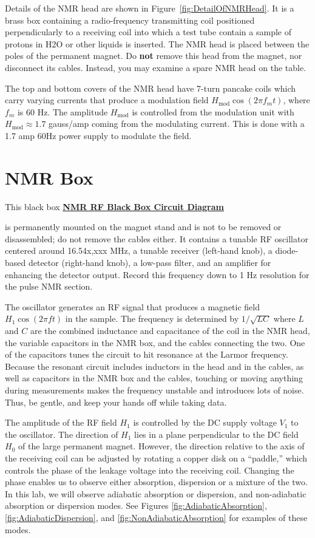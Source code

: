 \documentclass{../lab}
\begin{document}
Details of the NMR head are shown in Figure~\ref{fig:DetailOfNMRHead}. It is a brass box containing a radio-frequency transmitting coil positioned perpendicularly to a receiving coil into which a test tube contain a sample of protons in H2O or other liquids is inserted. The NMR head is placed between the poles of the permanent magnet. Do \textbf{not} remove this head from the magnet, nor disconnect its cables. Instead, you may examine a spare NMR head on the table.

The top and bottom covers of the NMR head have 7-turn pancake coils which carry varying currents that produce a modulation field $H_\text{mod} \cos(2 \pi f_m t)$, where $f_m$ is 60 Hz. The amplitude $H_\text{mod}$ is controlled from the modulation unit with $H_\text{mod} \approx 1.7$ gauss/amp coming from the modulating current. This is done with a 1.7 amp 60Hz power supply to modulate the field.

\section{NMR Box}

This black box \href{http://experimentationlab.berkeley.edu/sites/default/files/images/NMR31.gif}{\textbf{NMR RF Black Box Circuit Diagram}}

is permanently mounted on the magnet stand and is not to be removed or disassembled; do not remove the cables either. It contains a tunable RF oscillator centered around 16.54x,xxx MHz, a tunable receiver (left-hand knob), a diode-based detector (right-hand knob), a low-pass filter, and an amplifier for enhancing the detector output. Record this frequency down to 1 Hz resolution for the pulse NMR section.

The oscillator generates an RF signal that produces a magnetic field $H_1\cos(2\pi f t)$ in the sample. The frequency is determined by $1/\sqrt{LC}$ where $L$ and $C$ are the combined inductance and capacitance of the coil in the NMR head, the variable capacitors in the NMR box, and the cables connecting the two. One of the capacitors tunes the circuit to hit resonance at the Larmor frequency. Because the resonant circuit includes inductors in the head and in the cables, as well as capacitors in the NMR box and the cables, touching or moving anything during measurements makes the frequency unstable and introduces lots of noise. Thus, be gentle, and keep your hands off while taking data.

The amplitude of the RF field $H_1$ is controlled by the DC supply voltage $V_1$ to the oscillator. The direction of $H_1$ lies in a plane perpendicular to the DC field $H_0$ of the large permanent magnet. However, the direction relative to the axis of the receiving coil can be adjusted by rotating a copper disk on a ``paddle,'' which controls the phase of the leakage voltage into the receiving coil. Changing the phase enables us to observe either absorption, dispersion or a mixture of the two. In this lab, we will observe adiabatic absorption or dispersion, and non-adiabatic absorption or dispersion modes. See Figures \ref{fig:AdiabaticAbsorption}, \ref{fig:AdiabaticDispersion}, and \ref{fig:NonAdiabaticAbsorption} for examples of these modes.
\end{document}
